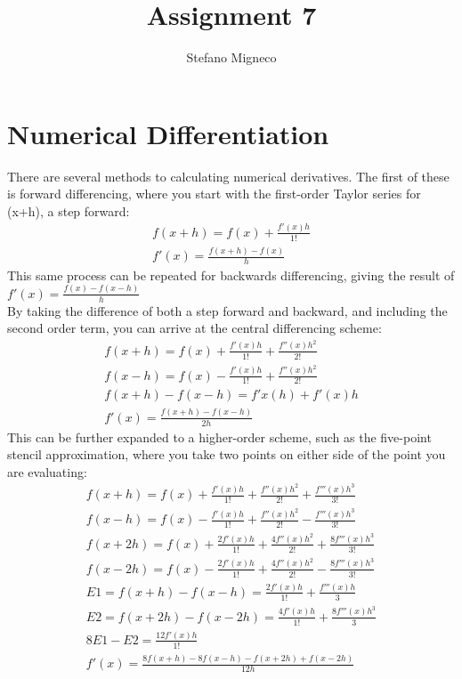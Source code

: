 \documentclass{article}
\title{Assignment 7}
\author{Stefano Migneco}
\date{}
\begin{document}
\maketitle

\section{Numerical Differentiation}
There are several methods to calculating numerical derivatives. The first of these is forward differencing, where you start with the first-order Taylor series for (x+h), a step forward:
\begin{align}
    f(x+h)=f(x)+ \frac {f'(x)h} {1!}\\
    f'(x)=\frac {f(x+h)-f(x)} {h}
\end{align}
This same process can be repeated for backwards differencing, giving the result of $f'(x)=\frac {f(x)-f(x-h)} {h}$\\
By taking the difference of both a step forward and backward, and including the second order term, you can arrive at the central differencing scheme:
\begin{align}
    f(x+h)=f(x)+ \frac {f'(x)h} {1!} +\frac{f''(x)h^2}{2!}\\
    f(x-h)=f(x)- \frac {f'(x)h} {1!} +\frac{f''(x)h^2}{2!}\\
    f(x+h)-f(x-h) = f'x(h)+f'(x)h\\
    f'(x) =\frac{f(x+h)-f(x-h)}{2h}
\end{align}
This can be further expanded to a higher-order scheme, such as the five-point stencil approximation, where you take two points on either side of the point you are evaluating:
\begin{align}
    f(x+h)=f(x)+ \frac {f'(x)h} {1!} +\frac{f''(x)h^2}{2!}+\frac{f'''(x)h^3}{3!}\\
    f(x-h)=f(x)- \frac {f'(x)h} {1!} +\frac{f''(x)h^2}{2!}-\frac{f'''(x)h^3}{3!}\\
    f(x+2h)=f(x)+ \frac {2f'(x)h} {1!} +\frac{4f''(x)h^2}{2!}+\frac{8f'''(x)h^3}{3!}\\
    f(x-2h)=f(x)- \frac {2f'(x)h} {1!} +\frac{4f''(x)h^2}{2!}-\frac{8f'''(x)h^3}{3!}\\
    E1=f(x+h)-f(x-h)=\frac {2f'(x)h} {1!} + \frac {f'''(x)h} {3}\\
    E2=f(x+2h)-f(x-2h)=\frac {4f'(x)h} {1!}+\frac{8f'''(x)h^3}{3}\\
    8E1-E2=\frac {12f'(x)h} {1!}\\
    f'(x)=\frac{8f(x+h)-8f(x-h)-f(x+2h)+f(x-2h)}{12h}
\end{align}
\end{document}
